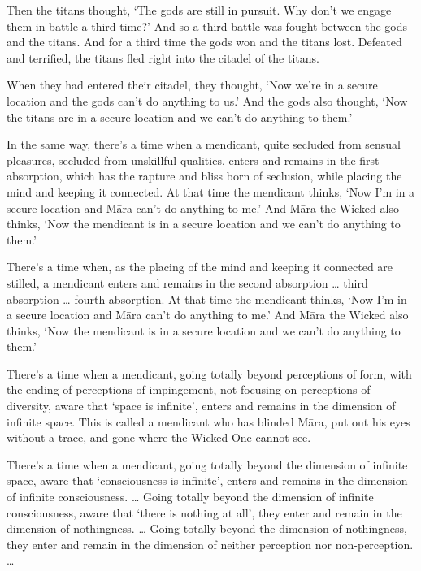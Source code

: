 \documentclass[12pt,openany]{book}%
\begin{document}
Then the titans thought, ‘The gods are still in pursuit. Why don’t we engage them in battle a third time?’ And so a third battle was fought between the gods and the titans. And for a third time the gods won and the titans lost. Defeated and terrified, the titans fled right into the citadel of the titans. 

When they had entered their citadel, they thought, ‘Now we’re in a secure location and the gods can’t do anything to us.’ And the gods also thought, ‘Now the titans are in a secure location and we can’t do anything to them.’ 

In the same way, there’s a time when a mendicant, quite secluded from sensual pleasures, secluded from unskillful qualities, enters and remains in the first absorption, which has the rapture and bliss born of seclusion, while placing the mind and keeping it connected. At that time the mendicant thinks, ‘Now I’m in a secure location and \textsanskrit{Māra} can’t do anything to me.’ And \textsanskrit{Māra} the Wicked also thinks, ‘Now the mendicant is in a secure location and we can’t do anything to them.’ 

There’s a time when, as the placing of the mind and keeping it connected are stilled, a mendicant enters and remains in the second absorption … third absorption … fourth absorption. At that time the mendicant thinks, ‘Now I’m in a secure location and \textsanskrit{Māra} can’t do anything to me.’ And \textsanskrit{Māra} the Wicked also thinks, ‘Now the mendicant is in a secure location and we can’t do anything to them.’ 

There’s a time when a mendicant, going totally beyond perceptions of form, with the ending of perceptions of impingement, not focusing on perceptions of diversity, aware that ‘space is infinite’, enters and remains in the dimension of infinite space. This is called a mendicant who has blinded \textsanskrit{Māra}, put out his eyes without a trace, and gone where the Wicked One cannot see. 

There’s a time when a mendicant, going totally beyond the dimension of infinite space, aware that ‘consciousness is infinite’, enters and remains in the dimension of infinite consciousness. … Going totally beyond the dimension of infinite consciousness, aware that ‘there is nothing at all’, they enter and remain in the dimension of nothingness. … Going totally beyond the dimension of nothingness, they enter and remain in the dimension of neither perception nor non-perception. … 
\end{document}
